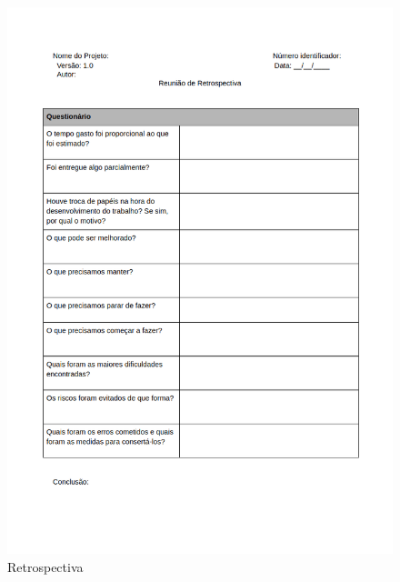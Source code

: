 \documentclass[	DIV=calc,%
							paper=a4,%
							fontsize=12pt,%
							onecolumn]{scrartcl}	 					%
\begin{document}
\begin{figure}
	\centering
	\includegraphics[width=\textwidth]{7.png}
	\caption{Retrospectiva}
	\label{Figura 9}
\end{figure}
\end{document}
